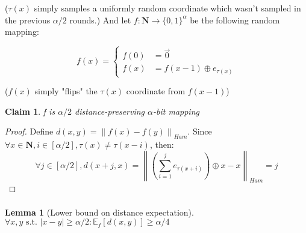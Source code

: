 \documentclass{scrartcl}
\newcommand{\zo}{\{0,1\}}
\newcommand{\st}{\text{ s.t. }}
\newcommand{\N}{{\mathbf{N}}}
\newcommand{\xor}{\oplus}
\newtheorem{lemma}[theorem]{Lemma}
\newtheorem{claim}[theorem]{Claim}
\newcommand{\E}{{\mathbb E}}
\newcommand{\norm}[1]{\left\lVert#1\right\rVert}
\begin{document}
($\tau(x)$ simply samples a uniformly random coordinate which wasn't sampled in the previous $\alpha/2$ rounds.)\newline\newline
And let $f : \N \rightarrow \zo^\alpha$ be the following random mapping:

\[
f(x) =
\begin{cases}
    f(0) &= \vec{0} \\
    f(x) &= f(x-1) \xor e_{\tau(x)}
\end{cases}
\]

($f(x)$ simply "flips" the $\tau(x)$ coordinate from $f(x-1)$)
\begin{claim}
f is $\alpha/2$ distance-preserving $\alpha$-bit mapping	
\end{claim}

\begin{proof}
Define $d(x,y) =  \norm{f(x)-f(y)}_{Ham}$.\newline
	Since $\forall x\in \N, i \in [\alpha/2], \tau(x) \neq \tau(x-i)$, then:
	$$\forall j \in [\alpha/2], d(x+j,x) = \norm{(\sum_{i=1}^j e_{\tau(x+i)}) \xor x - x}_{Ham} = j$$
\end{proof}

\paragraph{}


\begin{lemma}[Lower bound on distance expectation]
\label{dist_lb}
	$\forall x,y \st |x-y|\geq \alpha/2 : \E_f[d(x,y)] \geq \alpha/4$
\end{lemma}
\end{document}
